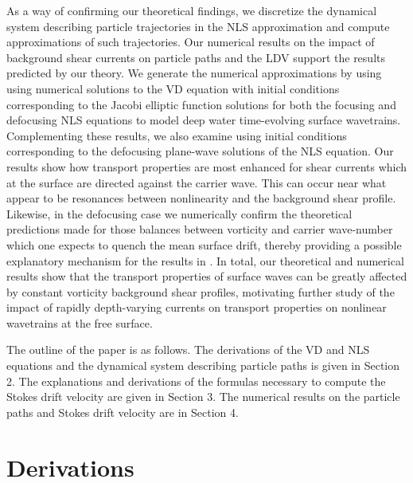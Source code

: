 \documentclass{JFM_Style/jfm}
\begin{document}
As a way of confirming our theoretical findings, we discretize the dynamical system describing particle trajectories in the NLS approximation and compute approximations of such trajectories. Our numerical results on the impact of background shear currents on particle paths and the LDV support the results predicted by our theory. We generate the numerical approximations by using using numerical solutions to the VD equation with initial conditions corresponding to the Jacobi elliptic function solutions for both the focusing and defocusing NLS equations to model deep water time-evolving surface wavetrains.  Complementing these results, we also examine using initial conditions corresponding to the defocusing plane-wave solutions of the NLS equation.  Our results show how transport properties are most enhanced for shear currents which at the surface are directed against the carrier wave.  This can occur near what appear to be resonances between nonlinearity and the background shear profile.  Likewise, in the defocusing case we numerically confirm the theoretical predictions made for those balances between vorticity and carrier wave-number which one expects to quench the mean surface drift, thereby providing a possible explanatory mechanism for the results in \cite{smith,breivik,monismith}.  In total, our theoretical and numerical results show that the transport properties of surface waves can be greatly affected by constant vorticity background shear profiles, motivating further study of the impact of rapidly depth-varying currents
on transport properties on nonlinear wavetrains at the free surface.

The outline of the paper is as follows.  The derivations of the VD and NLS equations and the dynamical system describing particle paths is given in Section 2.  The explanations and derivations of the formulas necessary to compute the Stokes drift velocity are given in Section 3.  The numerical results on the particle paths and Stokes drift velocity are in Section 4.
\section{Derivations}
\end{document}
